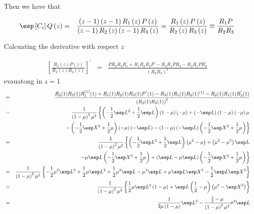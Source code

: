 Then we have that 

\begin{eqnarray}
\esp\left[C_{i}\right]Q\left(z\right)&=&\frac{\left(z-1\right)\left(z-1\right)R_{1}\left(z\right)P\left(z\right)}{\left(z-1\right)R_{2}\left(z\right)\left(z-1\right)R_{3}\left(z\right)}
=\frac{R_{1}\left(z\right)P\left(z\right)}{R_{2}\left(z\right)R_{3}\left(z\right)}\equiv\frac{R_{1}P}{R_{2}R_{3}}
\end{eqnarray}

Calcuating the derivative with respect $z$

\begin{eqnarray}\label{Ec.Primer.Derivada.Q}
\left[\frac{R_{1}\left(z\right)P\left(z\right)}{R_{2}\left(z\right)R_{3}\left(z\right)}\right]^{'}&=&\frac{PR_{2}R_{3}R_{1}^{'}
+R_{1}R_{2}R_{3}P^{'}-R_{3}R_{1}PR_{2}-R_{2}R_{1}PR_{3}^{'}}{\left(R_{2}R_{3}\right)^{2}}
\end{eqnarray}
evauatong in $z=1$
\begin{eqnarray*}
&=&\frac{R_{2}(1)R_{3}(1)R_{1}^{(1)}(1)+R_{1}(1)R_{2}(1)R_{3}(1)P^{'}(1)-R_{3}(1)R_{1}(1)R_{2}(1)^{(1)}-R_{2}(1)R_{1}(1)R_{3}^{'}(1)}{\left(R_{2}(1)R_{3}(1)\right)^{2}}\\
&=&\frac{1}{\left(1-\mu\right)^{2}\mu^{2}}\left\{\left(-\frac{1}{2}\esp L^{2}+\frac{1}{2}\esp L\right)\left(1-\mu\right)\left(-\mu\right)+\left(-\esp L\right)\left(1-\mu\right)\left(-\mu\right)\mu\right.\\
&&\left.-\left(-\frac{1}{2}\esp X^{2}+\frac{1}{2}\mu\right)\left(-\mu\right)\left(-\esp L\right)-\left(1-\mu\right)\left(-\esp L\right)\left(-\frac{1}{2}\esp X^{2}+\frac{1}{2}\mu\right)\right\}\\
&=&\frac{1}{\left(1-\mu\right)^{2}\mu^{2}}\left\{\left(-\frac{1}{2}\esp L^{2}+\frac{1}{2}\esp L\right)\left(\mu^{2}-\mu\right)
+\left(\mu^{2}-\mu^{3}\right)\esp L\right.\\
&&\left.-\mu\esp L\left(-\frac{1}{2}\esp X^{2}+\frac{1}{2}\mu\right)
+\left(\esp L-\mu\esp L\right)\left(-\frac{1}{2}\esp X^{2}+\frac{1}{2}\mu\right)\right\}\\
&=&\frac{1}{\left(1-\mu\right)^{2}\mu^{2}}\left\{-\frac{1}{2}\mu^{2}\esp L^{2}
+\frac{1}{2}\mu\esp L^{2}
+\frac{1}{2}\mu^{2}\esp L
-\mu^{3}\esp L
+\mu\esp L\esp X^{2}
-\frac{1}{2}\esp L\esp X^{2}\right\}\\
&=&\frac{1}{\left(1-\mu\right)^{2}\mu^{2}}\left\{
\frac{1}{2}\mu\esp L^{2}\left(1-\mu\right)
+\esp L\left(\frac{1}{2}-\mu\right)\left(\mu^{2}-\esp X^{2}\right)\right\}\\
&=&\frac{1}{2\mu\left(1-\mu\right)}\esp L^{2}-\frac{\frac{1}{2}-\mu}{\left(1-\mu\right)^{2}\mu^{2}}\sigma^{2}\esp L
\end{eqnarray*}


